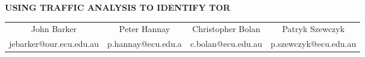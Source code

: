 \documentclass{ecuthesis}
\begin{document}
{\center \Large \bfseries \MakeUppercase{Using traffic analysis to identify Tor} \par}

{ \center
  \begin{tabular*}{\textwidth}{cccc}
  John Barker & Peter Hannay & Christopher Bolan & Patryk Szewczyk \\
  jebarker@our.ecu.edu.au & p.hannay@ecu.edu.a & c.bolan@ecu.edu.au & p.szewczyk@ecu.edu.au \\
  \end{tabular*}
}



\printbibliography[title=REFERENCES]
\end{document}
